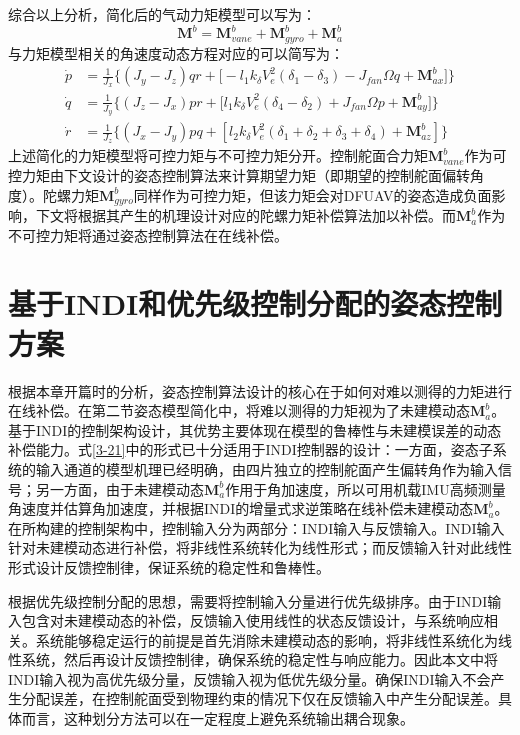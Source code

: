 综合以上分析，简化后的气动力矩模型可以写为：
\begin{equation}
    \boldsymbol{M}^b=\boldsymbol{M}_{vane}^b+\boldsymbol{M}_{gyro}^b+\boldsymbol{M}_{a}^b
    \label{3-20}
\end{equation}
与力矩模型相关的角速度动态方程对应的可以简写为：
\begin{equation}
    \begin{aligned}
        \dot{p}  &=\frac{1}{J_x}\Bigg\{ (J_y-J_z)qr+
        \big[- l_1k_\delta V_e^2(\delta_1 - \delta_3)-J_{fan}\Omega{q} +\boldsymbol{M}_{ax}^b\big]\Bigg\} \\
        \dot{q}  &=\frac{1}{J_y}\Bigg\{ (J_z-J_x)pr+
        \big[l_1k_\delta V_e^2(\delta_4 - \delta_2)+J_{fan}\Omega{p} +\boldsymbol{M}_{ay}^b\big]\Bigg\} \\
        \dot{r}  &=\frac{1}{J_z}\Bigg\{ (J_x-J_y)pq+
        \left[l_2k_\delta V_e^2(\delta_1 + \delta_2 + \delta_3 + \delta_4) + \boldsymbol{M}_{az}^b\right]
        \Bigg\}
    \end{aligned}
    \label{3-21}
\end{equation}
上述简化的力矩模型将可控力矩与不可控力矩分开。控制舵面合力矩$\boldsymbol{M}_{vane}^b$作为可控力矩由下文设计的姿态控制算法来计算期望力矩（即期望的控制舵面偏转角度）。陀螺力矩$\boldsymbol{M}_{gyro}^b$同样作为可控力矩，但该力矩会对DFUAV的姿态造成负面影响，下文将根据其产生的机理设计对应的陀螺力矩补偿算法加以补偿。而$\boldsymbol{M}_{a}^b$作为不可控力矩将通过姿态控制算法在在线补偿。

\section{基于INDI和优先级控制分配的姿态控制方案}

根据本章开篇时的分析，姿态控制算法设计的核心在于如何对难以测得的力矩进行在线补偿。在第二节姿态模型简化中，将难以测得的力矩视为了未建模动态$\boldsymbol{M}_{a}^b$。基于INDI的控制架构设计，其优势主要体现在模型的鲁棒性与未建模误差的动态补偿能力。式\eqref{3-21}中的形式已十分适用于INDI控制器的设计：一方面，姿态子系统的输入通道的模型机理已经明确，由四片独立的控制舵面产生偏转角作为输入信号；另一方面，由于未建模动态$\boldsymbol{M}_{a}^b$作用于角加速度，所以可用机载IMU高频测量角速度并估算角加速度，并根据INDI的增量式求逆策略在线补偿未建模动态$\boldsymbol{M}_{a}^b$。在所构建的控制架构中，控制输入分为两部分：INDI输入与反馈输入。INDI输入针对未建模动态进行补偿，将非线性系统转化为线性形式；而反馈输入针对此线性形式设计反馈控制律，保证系统的稳定性和鲁棒性。

根据优先级控制分配的思想，需要将控制输入分量进行优先级排序。由于INDI输入包含对未建模动态的补偿，反馈输入使用线性的状态反馈设计，与系统响应相关。系统能够稳定运行的前提是首先消除未建模动态的影响，将非线性系统化为线性系统，然后再设计反馈控制律，确保系统的稳定性与响应能力。因此本文中将INDI输入视为高优先级分量，反馈输入视为低优先级分量。确保INDI输入不会产生分配误差，在控制舵面受到物理约束的情况下仅在反馈输入中产生分配误差。具体而言，这种划分方法可以在一定程度上避免系统输出耦合现象\cite{HKXB202010026}。

